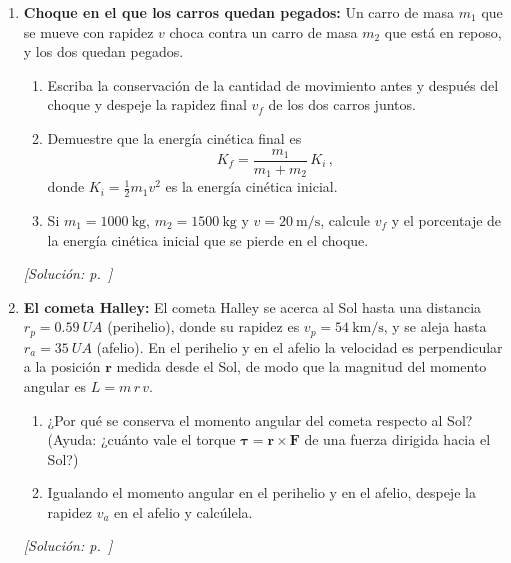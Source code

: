 \documentclass[11pt,a4paper]{book}
\begin{document}
\begin{enumerate}[label=\textbf{P\arabic*.}, ref=P\arabic*, leftmargin=*]
    \item\label{prob:parcial2-choque} \textbf{Choque en el que los carros
    quedan pegados:} Un carro de masa $m_1$ que se mueve con rapidez $v$
    choca contra un carro de masa $m_2$ que está en reposo, y los dos quedan
    pegados.
    \begin{enumerate}
        \item Escriba la conservación de la cantidad de movimiento antes y
        después del choque y despeje la rapidez final $v_f$ de los dos carros
        juntos.
        \item Demuestre que la energía cinética final es
        \begin{equation*}
            K_f = \frac{m_1}{m_1 + m_2}\,K_i\,,
        \end{equation*}
        donde $K_i = \tfrac{1}{2}m_1 v^2$ es la energía cinética inicial.
        \item Si $m_1 = \SI{1000}{\kilogram}$, $m_2 = \SI{1500}{\kilogram}$ y
        $v = \SI{20}{\meter\per\second}$, calcule $v_f$ y el porcentaje de la
        energía cinética inicial que se pierde en el choque.
    \end{enumerate}
    \hfill\textit{[Solución: p.~\pageref{sol:parcial2-choque}]}

    \item\label{prob:parcial2-cometa} \textbf{El cometa Halley:} El cometa
    Halley se acerca al Sol hasta una distancia $r_p = \SI{0.59}{UA}$
    (perihelio), donde su rapidez es $v_p = \SI{54}{\kilo\meter\per\second}$,
    y se aleja hasta $r_a = \SI{35}{UA}$ (afelio). En el perihelio y en el
    afelio la velocidad es perpendicular a la posición $\boldsymbol{r}$
    medida desde el Sol, de modo que la magnitud del momento angular es
    $L = m\,r\,v$.
    \begin{enumerate}
        \item ¿Por qué se conserva el momento angular del cometa respecto al
        Sol? (Ayuda: ¿cuánto vale el torque
        $\boldsymbol{\tau} = \boldsymbol{r}\times\boldsymbol{F}$ de una fuerza
        dirigida hacia el Sol?)
        \item Igualando el momento angular en el perihelio y en el afelio,
        despeje la rapidez $v_a$ en el afelio y calcúlela.
    \end{enumerate}
    \hfill\textit{[Solución: p.~\pageref{sol:parcial2-cometa}]}


\end{enumerate}
\end{document}
